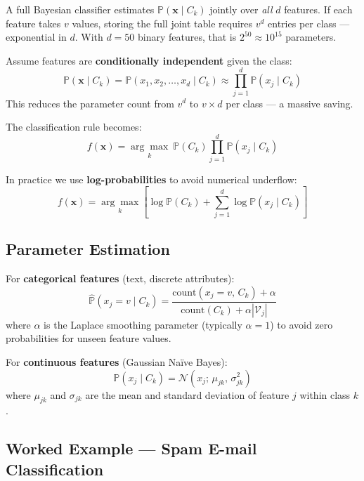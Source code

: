\documentclass[12pt,a4paper]{article}
\newcommand{\Prob}{\mathbb{P}}
\newcommand{\x}{\mathbf{x}}
\begin{document}
A full Bayesian classifier estimates $\Prob(\x \mid C_k)$ jointly over \emph{all} $d$ features. If each feature takes $v$ values, storing the full joint table requires $v^d$ entries per class — exponential in $d$. With $d=50$ binary features, that is $2^{50} \approx 10^{15}$ parameters.

\begin{tcolorbox}[defbox, title={The Na\"{i}ve Bayes Assumption}]
Assume features are \textbf{conditionally independent} given the class:
\[
  \Prob(\x \mid C_k) = \Prob(x_1,x_2,\ldots,x_d \mid C_k)
  \approx \prod_{j=1}^{d} \Prob(x_j \mid C_k)
\]
This reduces the parameter count from $v^d$ to $v \times d$ per class — a massive saving.
\end{tcolorbox}

The classification rule becomes:
\[
  \boxed{f(\x) = \underset{k}{\arg\max}\ \Prob(C_k) \prod_{j=1}^{d} \Prob(x_j \mid C_k)}
\]

In practice we use \textbf{log-probabilities} to avoid numerical underflow:
\[
  f(\x) = \underset{k}{\arg\max}\left[\log\Prob(C_k) + \sum_{j=1}^{d} \log\Prob(x_j \mid C_k)\right]
\]

\subsection{Parameter Estimation}

For \textbf{categorical features} (text, discrete attributes):
\[
  \hat{\Prob}(x_j = v \mid C_k) = \frac{\text{count}(x_j=v,\, C_k) + \alpha}{\text{count}(C_k) + \alpha|\mathcal{V}_j|}
\]
where $\alpha$ is the Laplace smoothing parameter (typically $\alpha=1$) to avoid zero probabilities for unseen feature values.

For \textbf{continuous features} (Gaussian Na\"{i}ve Bayes):
\[
  \Prob(x_j \mid C_k) = \mathcal{N}(x_j;\, \mu_{jk},\, \sigma_{jk}^2)
\]
where $\mu_{jk}$ and $\sigma_{jk}$ are the mean and standard deviation of feature $j$ within class $k$.

\subsection{Worked Example — Spam E-mail Classification}
\end{document}
